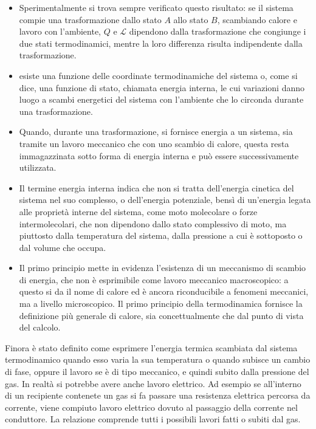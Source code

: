 \begin{itemize}
	\item Sperimentalmente si trova sempre verificato questo risultato: se il sistema compie una trasformazione dallo stato $A$ allo stato $B$, scambiando calore e lavoro con l'ambiente, $Q$ e $\mathcal{L}$ dipendono dalla trasformazione che congiunge i due stati termodinamici, mentre la loro differenza risulta indipendente dalla trasformazione.
	\item esiste una funzione delle coordinate termodinamiche del sistema o, come si dice, una funzione di stato, chiamata energia interna, le cui variazioni danno luogo a scambi energetici del sistema con l'ambiente che lo circonda durante una trasformazione.
	\item Quando, durante una trasformazione, si fornisce energia a un sistema, sia tramite un lavoro meccanico che con uno scambio di calore, questa resta immagazzinata sotto forma di energia interna e può essere successivamente
	utilizzata.
	\item Il termine energia interna indica che non si tratta dell'energia cinetica del sistema nel suo complesso, o dell'energia potenziale, bensì di un'energia legata alle proprietà interne del sistema, come moto molecolare o forze intermolecolari, che non dipendono dallo stato complessivo di moto, ma piuttosto dalla temperatura del sistema, dalla pressione a cui è sottoposto o dal volume che occupa.
	\item Il primo principio mette in evidenza l'esistenza di un meccanismo di scambio di energia, che non è esprimibile come lavoro meccanico macroscopico: a questo si da il nome di calore ed è ancora riconducibile a fenomeni meccanici, ma a livello microscopico. Il primo principio della termodinamica fornisce la definizione più generale di calore, sia concettualmente che dal punto di vista del calcolo.
\end{itemize}

Finora è stato definito come esprimere l'energia termica scambiata dal sistema termodinamico quando esso varia la sua temperatura o quando subisce un cambio di fase, oppure il lavoro se è di tipo meccanico, e quindi subito dalla pressione del gas. In realtà si potrebbe avere anche lavoro elettrico. Ad esempio se all'interno di un recipiente contenete un gas si fa passare una resistenza elettrica percorsa da corrente, viene compiuto lavoro elettrico dovuto al passaggio della corrente nel conduttore. La relazione comprende tutti i possibili lavori fatti o subiti dal gas.

